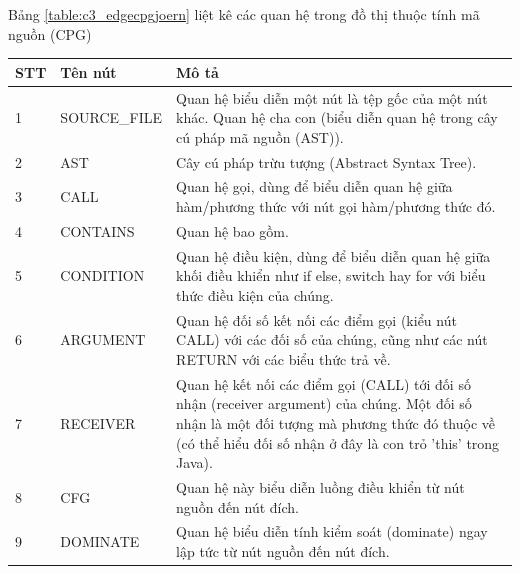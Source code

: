 Bảng \ref{table:c3_edgecpgjoern} liệt kê các quan hệ trong đồ thị thuộc tính mã nguồn (CPG)

\footnotesize
\begin{longtable}{| p{} | p{} | p{} |}
\hline
\textbf{STT} & \textbf{Tên nút} & \textbf{Mô tả} \\ \hline
1  & SOURCE\_FILE    & Quan hệ biểu diễn một nút là tệp gốc của một nút khác. Quan hệ cha con (biểu diễn quan hệ trong cây cú pháp mã nguồn (AST)).                                                                                 \\ \hline
2  & AST            & Cây cú pháp trừu tượng (Abstract Syntax Tree).                                                                                                                                                               \\ \hline
3  & CALL           & Quan hệ gọi, dùng để biểu diễn quan hệ giữa hàm/phương thức với nút gọi hàm/phương thức đó.                                                                                                                  \\ \hline
4  & CONTAINS       & Quan hệ bao gồm.                                                                                                                                                                                             \\ \hline
5  & CONDITION      & Quan hệ điều kiện, dùng để biểu diễn quan hệ giữa khối điều khiển như if else, switch hay for với biểu thức điều kiện của chúng.                                                                             \\ \hline
6  & ARGUMENT       & Quan hệ đối số kết nối các điểm gọi (kiểu nút CALL) với các đối số của chúng, cũng như các nút RETURN với các biểu thức trả về.                                                                              \\ \hline
7  & RECEIVER       & Quan hệ kết nối các điểm gọi (CALL) tới đối số nhận (receiver argument) của chúng. Một đối số nhận là một đối tượng mà phương thức đó thuộc về (có thể hiểu đối số nhận ở đây là con trỏ 'this' trong Java). \\ \hline
8  & CFG            & Quan hệ này biểu diễn luồng điều khiển từ nút nguồn đến nút đích.                                                                                                                                            \\ \hline
9  & DOMINATE       & Quan hệ biểu diễn tính kiểm soát (dominate) ngay lập tức từ nút nguồn đến nút đích.                                                                                                                          \\ \hline

\end{longtable}
